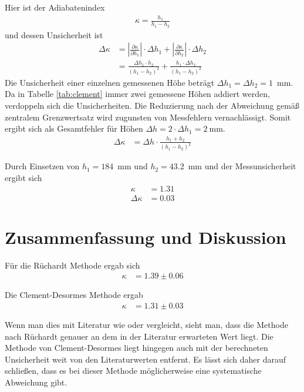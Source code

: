 \documentclass{article}
\begin{document}
Hier ist der Adiabatenindex
\begin{align}
\kappa = \frac{h_1}{h_1-h_2}
\end{align}
und dessen Unsicherheit ist
\begin{align}
\Delta \kappa &= \left| \frac{\partial\kappa}{\partial h_1}\right|\cdot \Delta h_1 + \left| \frac{\partial\kappa}{\partial h_2}\right|\cdot \Delta h_2 \\
&= \frac{\Delta h_1 \cdot h_2}{(h_1-h_2)^2} + \frac{h_1\cdot \Delta h_2}{(h_1-h_2)^2}
\end{align}
Die Unsicherheit einer einzelnen gemessenen Höhe beträgt $\Delta h_1 = \Delta h_2 = 1$~mm. Da in Tabelle \ref{tab:clement} immer zwei gemessene Höhen addiert werden, verdoppeln sich die Unsicherheiten. Die Reduzierung nach der Abweichung gemäß zentralem Grenzwertsatz wird zugunsten von Messfehlern vernachlässigt. Somit ergibt sich als Gesamtfehler für Höhen $\Delta h = 2\cdot \Delta h_1 = 2~$mm.
\begin{align}
\Delta \kappa &= \Delta h \cdot\frac{h_1 + h_2}{(h_1-h_2)^2}
\end{align}

Durch Einsetzen von $h_1=184$~mm und $h_2 = 43.2$~mm und der Messunsicherheit ergibt sich
\begin{align}
\kappa &= 1.31 \\
\Delta \kappa &= 0.03
\end{align}


\newpage
\section{Zusammenfassung und Diskussion}

Für die Rüchardt Methode ergab sich
\begin{align}
\kappa &= 1.39 \pm 0.06
\end{align}

Die Clement-Desormes Methode ergab
\begin{align}
\kappa &= 1.31 \pm 0.03
\end{align}

Wenn man dies mit Literatur wie \cite{demtr1} oder \cite{giancoli} vergleicht, sieht man, dass die Methode nach Rüchardt genauer an dem in der Literatur erwarteten Wert liegt. Die Methode von Clement-Desormes liegt hingegen auch mit der berechneten Unsicherheit weit von den Literaturwerten entfernt. Es lässt sich daher darauf schließen, dass es bei dieser Methode möglicherweise eine systematische Abweichung gibt.
\end{document}
